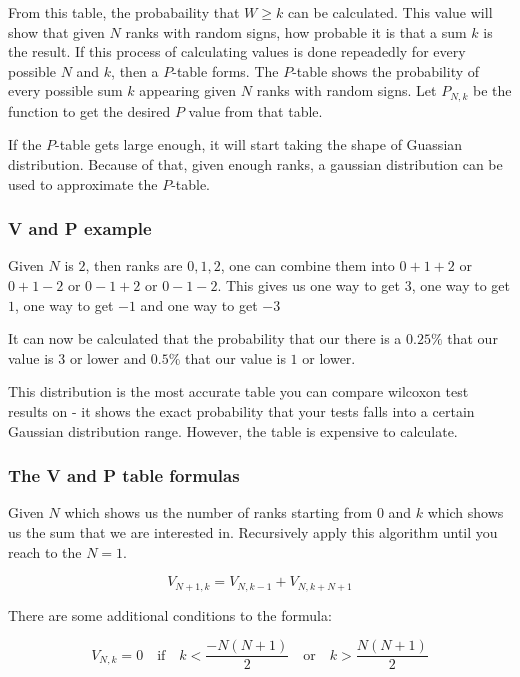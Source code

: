 \documentclass[12pt]{article}
\begin{document}
From this table, the probabaility that $W\geq k$ can be calculated. This value will show that given $N$ ranks with random signs, how probable it is that a sum $k$ is the result. If this process of calculating values is done repeadedly for every possible $N$ and $k$, then a $P$-table forms. The $P$-table shows the probability of every possible sum $k$ appearing given $N$ ranks with random signs. Let $P_{N, k}$ be the function to get the desired $P$ value from that table.

If the $P$-table gets large enough, it will start taking the shape of Guassian distribution. Because of that, given enough ranks, a gaussian distribution can be used to approximate the $P$-table.

\subsubsection{V and P example}

Given $N$ is $2$, then ranks are ${0, 1, 2}$, one can combine them into $0 + 1 + 2$ or $0 + 1 - 2$ or $0 - 1 + 2$ or $0 - 1 - 2$. This gives us one way to get $3$, one way to get $1$, one way to get $-1$ and one way to get $-3$

It can now be calculated that the probability that our there is a $0.25\%$ that our value is $3$ or lower and $0.5\%$ that our value is $1$ or lower.

This distribution is the most accurate table you can compare wilcoxon test results on - it shows the exact probability that your tests falls into a certain Gaussian distribution range. However, the table is expensive to calculate.

\subsubsection{The V and P table formulas}
\label{sec:v_p_table_formulas}

Given $N$ which shows us the number of ranks starting from $0$ and $k$ which shows us the sum that we are interested in. Recursively apply this algorithm until you reach to the $N = 1$.

\begin{equation}
  V_{N+1, k} = V_{N, k-1} + V_{N, k+N+1}
\end{equation}

There are some additional conditions to the formula:

\begin{equation}
V_{N, k} = 0  \quad\text{if}\quad k <  \frac{-N(N+1)}{2} \quad\text{or}\quad k >  \frac{N(N+1)}{2}
\end{equation}
\end{document}
